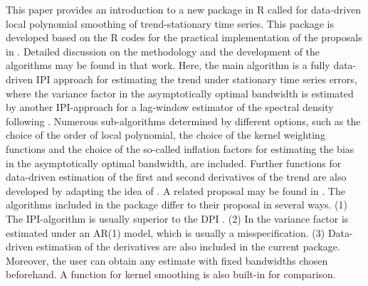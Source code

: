 This paper provides an introduction to a new package in R called  \citep[version 1.0.1, ][]{feng2019smoots} for data-driven local polynomial smoothing of trend-stationary time series. This package is developed based on the R codes for the practical implementation of the proposals in \citet{fenggriesfritz2020}. 
Detailed discussion on the methodology and the development of the algorithms may be found in that work. 
Here, the main algorithm is a fully data-driven IPI \citep[iterative plug-in,][]{gasser1991flexible} approach for estimating the trend under stationary time series errors, where the variance factor in the asymptotically optimal bandwidth is estimated by another IPI-approach for a lag-window estimator of the spectral density following \citet{buhlmann1996locally}. Numerous sub-algorithms determined by different options, such as the choice of the order of local polynomial, the choice of the kernel weighting functions and the choice of the so-called inflation factors for estimating the bias in the asymptotically optimal bandwidth, are included. 
Further functions for data-driven estimation of the first and second derivatives of the trend are also developed by adapting the idea of \citet{feng2007asymptotic}. A related proposal may be found in \citet{francisco2004plug}. The algorithms included in the   package differ to their proposal in several ways. (1) The IPI-algorithm is usually superior to the DPI \citep[see][for detailed discussion in models with i.i.d. errors]{beran2009modifying}. (2) In \citet{francisco2004plug} the variance factor is estimated under an AR(1) model, which is usually a misspecification. (3) Data-driven estimation of the derivatives are also included in the current package. Moreover, the user can obtain any estimate with fixed bandwidths chosen beforehand. A function for kernel smoothing is also built-in for comparison.        

